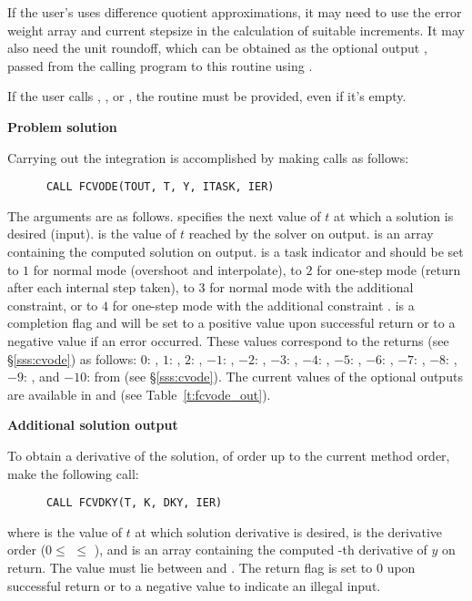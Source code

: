 \begin{Steps}
  If the user's  uses difference quotient approximations, it
  may need to use the error weight array  and current stepsize 
  in the calculation of suitable increments.  It may also need the unit
  roundoff, which can be obtained as the optional output ,
  passed from the calling program to this routine using .

  {\warn} If the user calls , , or 
  , the routine  must
  be provided, even if it's empty.

\item {\bf Problem solution}

  Carrying out the integration is accomplished by making calls as follows:
\begin{verbatim}
      CALL FCVODE(TOUT, T, Y, ITASK, IER)
\end{verbatim}
  The arguments are as follows.
   specifies the next value of $t$ at which a solution is desired (input).
   is the value of $t$ reached by the solver on output.
   is an array containing the computed solution on output.
   is a task indicator and should be set to $1$ for normal mode 
  (overshoot  and interpolate), to $2$ for one-step mode 
  (return after each internal step taken), to $3$ for normal mode with
  the additional  constraint, or to $4$ for one-step mode 
  with the additional constraint .
   is a completion flag and will be set to a positive value upon
  successful return or to a negative value if an error occurred. These values
  correspond to the  returns (see \S\ref{sss:cvode}) as follows:
  $0$: , $1$: , $2$: ,
  $-1$: , $-2$: , $-3$: ,
  $-4$: , $-5$: ,
  $-6$: , $-7$: ,
  $-8$: , $-9$: , and
  $-10$:  from  (see \S\ref{sss:cvode}).
  The current values of the optional outputs are available in  and
   (see Table~\ref{t:fcvode_out}).
  
\item {\bf Additional solution output}

  To obtain a derivative of the solution, of order up to the current method
  order, make the following call:
\begin{verbatim}
      CALL FCVDKY(T, K, DKY, IER)
\end{verbatim}
  where
   is the value of $t$ at which solution derivative is desired,
   is the derivative order ($0 \le$  $\le$ ), and
   is an array containing the computed -th derivative of $y$
  on return.  The value  must lie between  and .
  The return flag  is set to $0$ upon successful return or to a negative
  value to indicate an illegal input.
  

\end{Steps}
